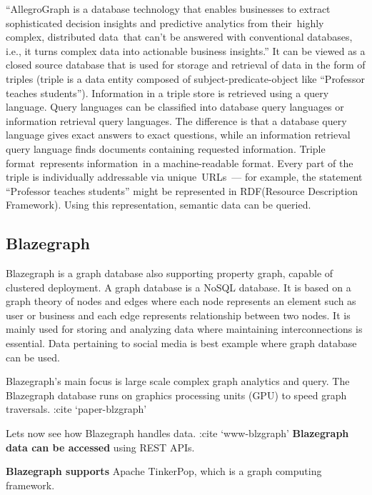      ``AllegroGraph is a database technology that enables businesses to
     extract sophisticated decision insights and predictive analytics
     from their highly complex, distributed data that can’t be
     answered with conventional databases, i.e., it turns complex data
     into actionable business insights.'' \cite{www-Allegro} It can be
     viewed as a closed source database that is used for storage and
     retrieval of data in the form of triples (triple is a data entity
     composed of subject-predicate-object like ``Professor teaches
     students'').  Information in a triple store is retrieved using a
     query language. Query languages can be classified into database
     query languages or information retrieval query languages. The
     difference is that a database query language gives exact answers
     to exact questions, while an information retrieval query language
     finds documents containing requested information.  Triple
     format represents information in a machine-readable format.
     Every part of the triple is individually addressable via
     unique URLs — for example, the statement ``Professor teaches
     students'' might be represented in RDF(Resource Description
     Framework). Using this representation, semantic data
     can be queried.  \cite{www-Allegrow}

\subsection{ Blazegraph}

     Blazegraph is a graph database also supporting property graph, 
     capable of clustered deployment. A graph database is a NoSQL 
     database. It is based on a graph theory of nodes and edges where 
     each node represents an element such as user or business and each 
     edge represents relationship between two nodes. It is mainly used 
     for storing and analyzing data where maintaining interconnections 
     is essential. Data pertaining to social media is best example where 
     graph database can be used.

     Blazegraph’s main focus is large scale complex graph analytics and query. 
     The Blazegraph database runs on graphics processing units (GPU) to 
     speed graph traversals. :cite ‘paper-blzgraph’

     Lets now see how Blazegraph handles data. :cite ‘www-blzgraph’ 
     {\bf Blazegraph data can be accessed} using REST APIs. 

     {\bf Blazegraph supports} Apache TinkerPop, which is a graph
      computing framework.

